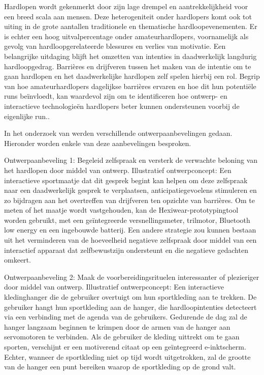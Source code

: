     Hardlopen wordt gekenmerkt door zijn lage drempel en aantrekkelijkheid voor een breed scala aan mensen. 
    Deze heterogeniteit onder hardlopers komt ook tot uiting in de grote aantallen traditionele en thematische hardloopevenementen. 
    Er is echter een hoog uitvalpercentage onder amateurhardlopers, voornamelijk als gevolg van hardloopgerelateerde blessures en verlies van motivatie. 
    Een belangrijke uitdaging blijft het omzetten van intenties in daadwerkelijk langdurig hardloopgedrag. 
    Barrières en drijfveren tussen het maken van de intentie om te gaan hardlopen en het daadwerkelijke hardlopen zelf spelen hierbij een rol. 
    Begrip van hoe amateurhardlopers dagelijkse barrières ervaren en hoe dit hun potentiële runs beïnvloedt, kan waardevol zijn 
    om te identificeren hoe ontwerp- en interactieve technologieën hardlopers beter kunnen ondersteunen voorbij de eigenlijke run.\textcite{Menheere2020}.

    In het onderzoek van \textcite{Menheere2020} werden verschillende ontwerpaanbevelingen gedaan. Hieronder worden enkele van deze aanbevelingen besproken.

    Ontwerpaanbeveling 1: Begeleid zelfspraak en versterk de verwachte beloning van het hardlopen door middel van ontwerp. 
    Illustratief ontwerpconcept: Een interactieve sportmaatje dat dit gesprek begint kan helpen om deze zelfspraak naar een daadwerkelijk gesprek te verplaatsen, 
    anticipatiegevoelens stimuleren en zo bijdragen aan het overtreffen van drijfveren ten opzichte van barrières. 
    Om te meten of het maatje wordt vastgehouden, kan de Hexiwear-prototypingtool worden gebruikt, met een geïntegreerde versnellingsmeter, 
    trilmotor, Bluetooth low energy en een ingebouwde batterij. Een andere strategie zou kunnen bestaan uit het verminderen van de hoeveelheid 
    negatieve zelfspraak door middel van een interactief apparaat dat zelfbewustzijn ondersteunt en die negatieve gedachten omkeert.

    Ontwerpaanbeveling 2: Maak de voorbereidingsrituelen interessanter of plezieriger door middel van ontwerp. 
    Illustratief ontwerpconcept: Een interactieve kledinghanger die de gebruiker overtuigt om hun sportkleding aan te trekken. 
    De gebruiker hangt hun sportkleding aan de hanger, die hardloopintenties detecteert via een verbinding met de agenda van de gebruikers. 
    Gedurende de dag zal de hanger langzaam beginnen te krimpen door de armen van de hanger aan servomotoren te verbinden. 
    Als de gebruiker de kleding uittrekt om te gaan sporten, verschijnt er een motiverend citaat op een geïntegreerd e-inktscherm. 
    Echter, wanneer de sportkleding niet op tijd wordt uitgetrokken, zal de grootte van de hanger een punt bereiken waarop de sportkleding op de grond valt.

